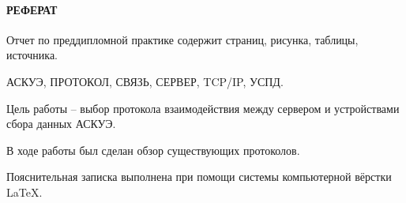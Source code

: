 \newpage
{}
\paragraph*{\hfill РЕФЕРАТ \hfill}
Отчет по преддипломной практике содержит  страниц,  рисунка,   таблицы,  источника. %

АСКУЭ, ПРОТОКОЛ, СВЯЗЬ, СЕРВЕР, TCP/IP, УСПД.

Цель работы -- выбор протокола взаимодействия между сервером и устройствами сбора данных АСКУЭ.

В ходе работы был сделан обзор существующих протоколов.

Пояснительная записка выполнена при помощи системы компьютерной вёрстки \LaTeX.